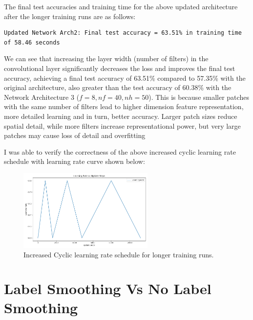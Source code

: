 \documentclass[11pt]{article}
\begin{document}
The final test accuracies and training time for the above updated architecture after the longer training runs are as follows:
\begin{lstlisting}[caption={Final test accuracy and training time for updated Arch2 longer training runs}, label={lst:longer_training_runs_accuracies}]
Updated Network Arch2: Final test accuracy = 63.51% in training time of 58.46 seconds
\end{lstlisting}

We can see that increasing the layer width (number of filters) in the convolutional layer significantly decreases the loss and improves the final test accuracy, achieving a final test accuracy of 63.51\% compared to 57.35\% with the original architecture, also greater than the test accuracy of 60.38\% with the Network Architecture 3 ($f=8, nf=40, nh=50$). This is because smaller patches with the same number of filters lead to higher dimension feature representation, more detailed learning and in turn, better accuracy. 
Larger patch sizes reduce spatial detail, while more filters increase representational power, but very large patches may cause loss of detail and overfitting

I was able to verify the correctness of the above increased cyclic learning rate schedule with learning rate curve shown below:

\begin{figure}[H]
  \centering
  \includegraphics[width=0.6\textwidth]{results/architecture_4_learning_rate_plot.png}
  \caption{Increased Cyclic learning rate schedule for longer training runs.}
  \label{fig:increased_cyclic_learning_rate}
\end{figure}

\section*{Label Smoothing Vs No Label Smoothing}
\end{document}
